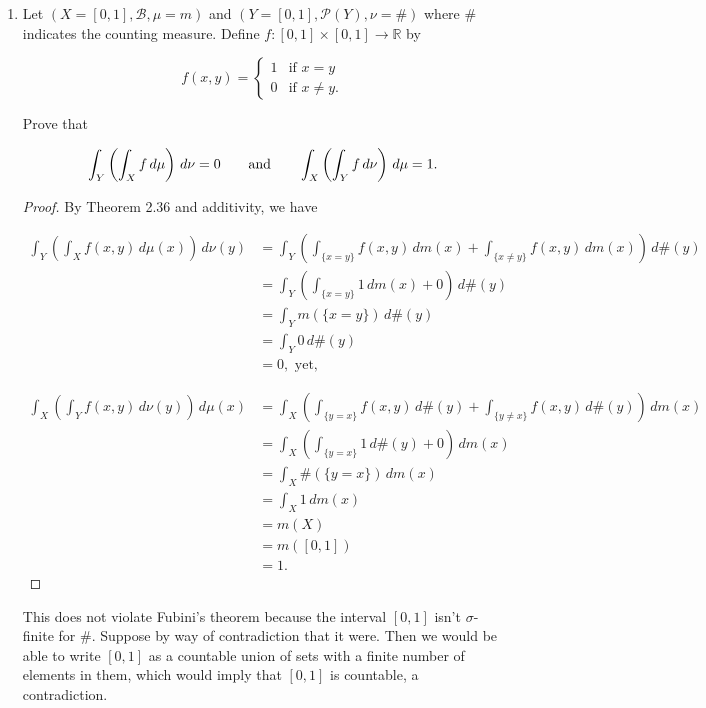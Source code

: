 \documentclass[11pt,oneside,english]{amsart}
\theoremstyle{definition}
\newcommand{\aspace}{\hspace{7mm}\text{and}\hspace{7mm}}
\newcommand{\R}{\mathbb{R}}
\newcommand{\MC}[1]{\mathcal{#1}}
\begin{document}
\begin{enumerate}
\begin{proof}
\end{proof}


\item Let $(X=[0,1],\MC{B},\mu=m)$ and $(Y=[0,1],\MC{P}(Y),\nu=\#)$ where $\#$ indicates the counting measure. Define $f:[0,1]\times[0,1]\rightarrow\R$ by

\[
f(x,y)=\begin{cases}1 & \text{if }x=y\\0 & \text{if }x\neq y.\end{cases}
\]

Prove that

\[
\int_Y\left(\int_Xf\,d\mu\right)\,d\nu=0\aspace \int_X\left(\int_Y f\,d\nu\right)\,d\mu=1.
\]


\begin{proof}
By Theorem 2.36 and additivity, we have

\begin{align*}
\int_Y\left(\int_Xf(x,y)\,d\mu(x)\right)\,d\nu(y)&=\int_Y\left(\int_{\{x=y\}}f(x,y)\,dm(x)+\int_{\{x\neq y\}}f(x,y)\,dm(x)\right)\,d\#(y)\\[2mm]
&=\int_Y\left(\int_{\{x=y\}}1\,dm(x)+0\right)\,d\#(y)\\[2mm]
&=\int_Ym(\{x=y\})\,d\#(y)\\[2mm]
&=\int_Y0\,d\#(y)\\[2mm]
&=0,\text{ yet,}
\end{align*}

\begin{align*}
\int_X\left(\int_Yf(x,y)\,d\nu(y)\right)\,d\mu(x)&=\int_X\left(\int_{\{y=x\}}f(x,y)\,d\#(y)+\int_{\{y\neq x\}}f(x,y)\,d\#(y)\right)\,dm(x)\\[2mm]
&=\int_X\left(\int_{\{y=x\}}1\,d\#(y)+0\right)\,dm(x)\\[2mm]
&=\int_X\#(\{y=x\})\,dm(x)\\[2mm]
&=\int_X1\,dm(x)\\[2mm]
&=m(X)\\[2mm]
&=m([0,1])\\[2mm]
&=1.
\end{align*}

\end{proof}

This does not violate Fubini's theorem because the interval $[0,1]$ isn't $\sigma$-finite for $\#$. Suppose by way of contradiction that it were. Then we would be able to write $[0,1]$ as a countable union of sets with a finite number of elements in them, which would imply that $[0,1]$ is countable, a contradiction.




\end{enumerate}
\end{document}
